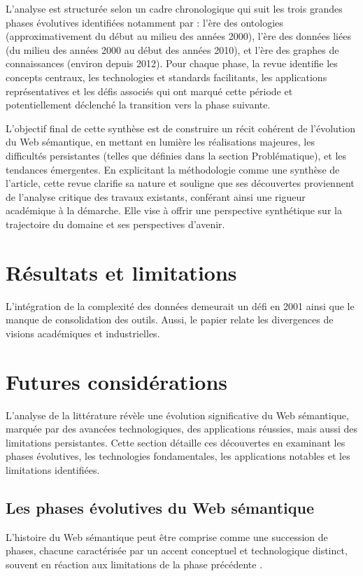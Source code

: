 \documentclass[9pt,twocolumn,twoside,french]{opticajnl}
\begin{document}
L'analyse est structurée selon un cadre chronologique qui suit les trois grandes phases évolutives identifiées notamment par \citet{Hitzler2021} : l'ère des ontologies (approximativement du début au milieu des années 2000), l'ère des données liées (du milieu des années 2000 au début des années 2010), et l'ère des graphes de connaissances (environ depuis 2012). Pour chaque phase, la revue identifie les concepts centraux, les technologies et standards facilitants, les applications représentatives et les défis associés qui ont marqué cette période et potentiellement déclenché la transition vers la phase suivante.

L'objectif final de cette synthèse est de construire un récit cohérent de l'évolution du Web sémantique, en mettant en lumière les réalisations majeures, les difficultés persistantes (telles que définies dans la section Problématique), et les tendances émergentes. En explicitant la méthodologie comme une synthèse de l'article, cette revue clarifie sa nature et souligne que ses découvertes proviennent de l'analyse critique des travaux existants, conférant ainsi une rigueur académique à la démarche. Elle vise à offrir une perspective synthétique sur la trajectoire du domaine et ses perspectives d'avenir.



\section{Résultats et limitations}

L'intégration de la complexité des données demeurait un défi en 2001 ainsi que le manque de consolidation des outils. Aussi, le papier relate les divergences de visions académiques et industrielles. 


\section{Futures considérations}
L'analyse de la littérature révèle une évolution significative du Web sémantique, marquée par des avancées technologiques, des applications réussies, mais aussi des limitations persistantes. Cette section détaille ces découvertes en examinant les phases évolutives, les technologies fondamentales, les applications notables et les limitations identifiées.

\subsection{Les phases évolutives du Web sémantique}
L'histoire du Web sémantique peut être comprise comme une succession de phases, chacune caractérisée par un accent conceptuel et technologique distinct, souvent en réaction aux limitations de la phase précédente \citep{Hitzler2021}.
\end{document}
